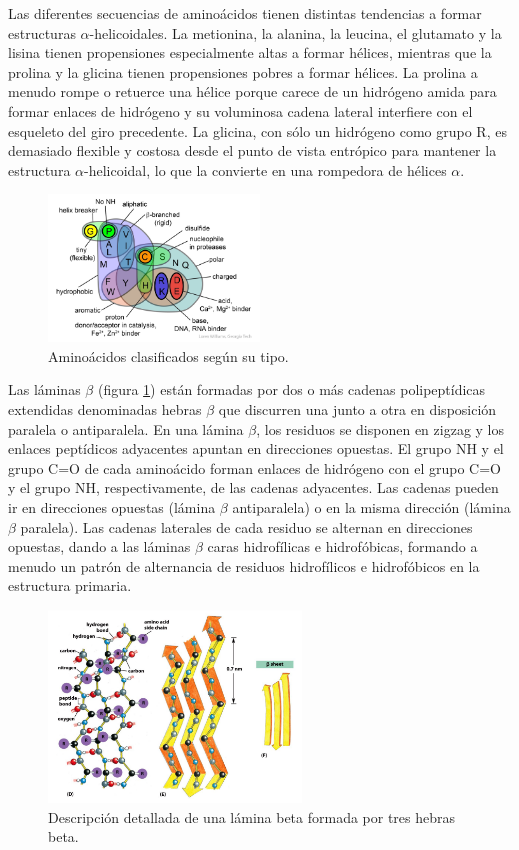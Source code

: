 Las diferentes secuencias de aminoácidos tienen distintas tendencias a formar estructuras $\alpha$-helicoidales. La metionina, la alanina, la leucina, el glutamato y la lisina tienen propensiones especialmente altas a formar hélices, mientras que la prolina y la glicina tienen propensiones pobres a formar hélices. La prolina a menudo rompe o retuerce una hélice porque carece de un hidrógeno amida para formar enlaces de hidrógeno y su voluminosa cadena lateral interfiere con el esqueleto del giro precedente. La glicina, con sólo un hidrógeno como grupo R, es demasiado flexible y costosa desde el punto de vista entrópico para mantener la estructura $\alpha$-helicoidal, lo que la convierte en una rompedora de hélices $\alpha$.

\begin{figure}[h]
\centering
\includegraphics[width = 0.5\textwidth]{figs/aa.png}
\caption{Aminoácidos clasificados según su tipo.}
\end{figure}

Las láminas $\beta$ (figura \ref{fig:beta}) están formadas por dos o más cadenas polipeptídicas extendidas denominadas hebras $\beta$ que discurren una junto a otra en disposición paralela o antiparalela. En una lámina $\beta$, los residuos se disponen en zigzag y los enlaces peptídicos adyacentes apuntan en direcciones opuestas. El grupo NH y el grupo C=O de cada aminoácido forman enlaces de hidrógeno con el grupo C=O y el grupo NH, respectivamente, de las cadenas adyacentes. Las cadenas pueden ir en direcciones opuestas (lámina $\beta$ antiparalela) o en la misma dirección (lámina $\beta$ paralela). Las cadenas laterales de cada residuo se alternan en direcciones opuestas, dando a las láminas $\beta$ caras hidrofílicas e hidrofóbicas, formando a menudo un patrón de alternancia de residuos hidrofílicos e hidrofóbicos en la estructura primaria.

\begin{figure}[h]
\centering
\includegraphics[width = 0.6\textwidth]{figs/beta.png}
\caption{Descripción detallada de una lámina beta formada por tres hebras beta.}
\label{fig:beta}
\end{figure}

